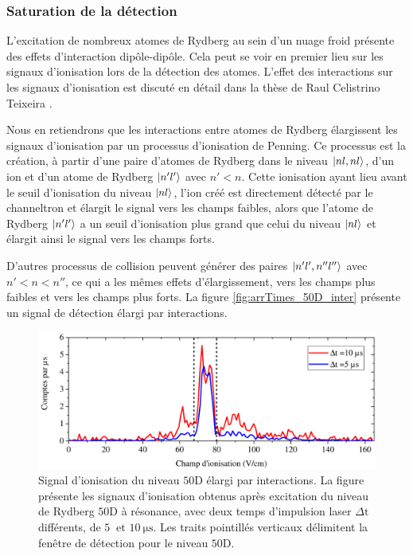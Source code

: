 		\subsubsection*{Saturation de la détection}
\noindent L'excitation de nombreux atomes de Rydberg au sein d'un nuage froid présente des effets d'interaction dipôle-dipôle.
Cela peut se voir en premier lieu sur les signaux d'ionisation lors de la détection des atomes.
L'effet des interactions sur les signaux d'ionisation est discuté en détail dans la thèse de Raul Celistrino Teixeira \cite{PHD_CELISTRINO}.

Nous en retiendrons que les interactions entre atomes de Rydberg élargissent les signaux d'ionisation par un processus d'ionisation de Penning.
Ce processus est la création, à partir d'une paire d'atomes de Rydberg dans le niveau $\ket{nl,nl}$, d'un ion et d'un atome de Rydberg $\ket{n'l'}$ avec $n'<n$.
Cette ionisation ayant lieu avant le seuil d'ionisation du niveau $\ket{nl}$, l'ion créé est directement détecté par le channeltron et élargit le signal vers les champs faibles, alors que l'atome de Rydberg $\ket{n'l'}$ a un seuil d'ionisation plus grand que celui du niveau $\ket{nl}$ et élargit ainsi le signal vers les champs forts.

D'autres processus de collision peuvent générer des paires $\ket{n'l',n''l''}$ avec $n'<n<n''$, ce qui a les mêmes effets d'élargissement, vers les champs plus faibles et vers les champs plus forts.
La figure \eqref{fig:arrTimes_50D_inter} présente un signal de détection élargi par interactions.

\begin{figure}[!h]
\centering
\includegraphics[width=\linewidth]{figures/circulars/arrTimes_50D_inter}
\caption[Signal d'ionisation élargi par interactions du niveau $\mathrm{50D}$]{
Signal d'ionisation du niveau $\mathrm{50D}$ élargi par interactions.
La figure présente les signaux d'ionisation obtenus après excitation du niveau de Rydberg $\mathrm{50D}$ à résonance, avec deux temps d'impulsion laser $\Delta \mathrm{t}$ différents, de $\SI{5}{}$ et $\SI{10}{\us}$.
Les traits pointillés verticaux délimitent la fenêtre de détection pour le niveau $\mathrm{50D}$.
}
\label{fig:arrTimes_50D_inter}
\end{figure}

